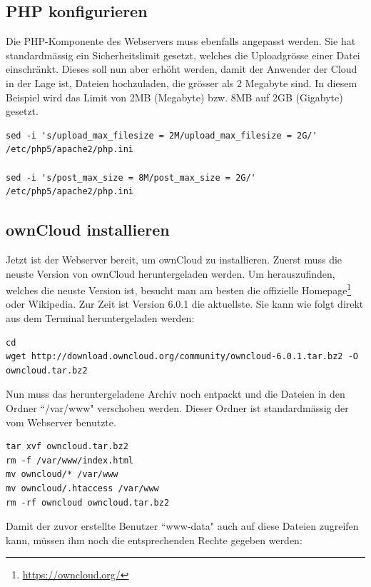 \subsection{PHP konfigurieren}
Die PHP-Komponente des Webservers muss ebenfalls angepasst werden. Sie hat standardmässig ein Sicherheitslimit gesetzt, welches die Uploadgrösse einer Datei einschränkt. Dieses soll nun aber erhöht werden, damit der Anwender der Cloud in der Lage ist, Dateien hochzuladen, die grösser als 2 Megabyte sind. In diesem Beispiel wird das Limit von 2MB (Megabyte) bzw. 8MB auf 2GB (Gigabyte) gesetzt.
\\

\begin{lstlisting}
sed -i 's/upload_max_filesize = 2M/upload_max_filesize = 2G/' /etc/php5/apache2/php.ini

sed -i 's/post_max_size = 8M/post_max_size = 2G/' /etc/php5/apache2/php.ini
\end{lstlisting}

\subsection{ownCloud installieren}
Jetzt ist der Webserver bereit, um ownCloud zu installieren. Zuerst muss die neuste Version von ownCloud heruntergeladen werden. Um herauszufinden, welches die neuste Version ist, besucht man am besten die offizielle Homepage\footnote{\url{https://owncloud.org/}} oder Wikipedia. Zur Zeit ist Version 6.0.1 die aktuellste. Sie kann wie folgt direkt aus dem Terminal heruntergeladen werden:

\begin{lstlisting}
cd
wget http://download.owncloud.org/community/owncloud-6.0.1.tar.bz2 -O owncloud.tar.bz2
\end{lstlisting}

Nun muss das heruntergeladene Archiv noch entpackt und die Dateien in den Ordner ``/var/www" verschoben werden. Dieser Ordner ist standardmässig der vom Webserver benutzte.

\begin{lstlisting}
tar xvf owncloud.tar.bz2
rm -f /var/www/index.html
mv owncloud/* /var/www
mv owncloud/.htaccess /var/www
rm -rf owncloud owncloud.tar.bz2
\end{lstlisting}

Damit der zuvor erstellte Benutzer ``www-data" auch auf diese Dateien zugreifen kann, müssen ihm noch die entsprechenden Rechte gegeben werden:

